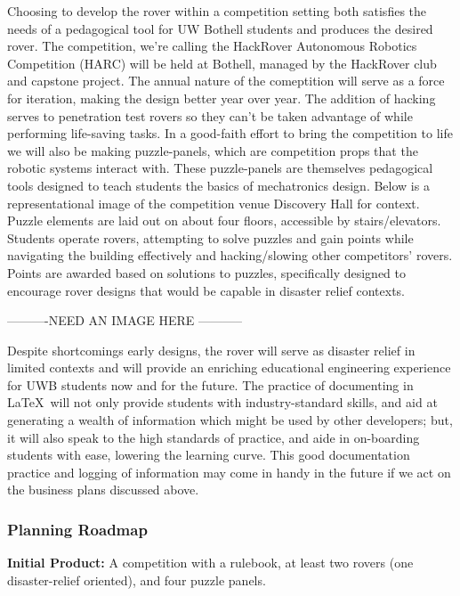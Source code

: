 \documentclass[a4paper, 10pt]{article}
\begin{document}
		Choosing to develop the rover within a competition setting both satisfies the needs of a pedagogical tool for UW Bothell students and produces the desired rover. The competition, we're calling the HackRover Autonomous Robotics Competition (HARC) will be held at Bothell, managed by the HackRover club and capstone project. The annual nature of the comeptition will serve as a force for iteration, making the design better year over year. The addition of hacking serves to penetration test rovers so they can't be taken advantage of while performing life-saving tasks. In a good-faith effort to bring the competition to life we will also be making puzzle-panels, which are competition props that the robotic systems interact with. These puzzle-panels are themselves pedagogical tools designed to teach students the basics of mechatronics design. Below is a representational image of the competition venue Discovery Hall for context. Puzzle elements are laid out on about four floors, accessible by stairs/elevators. Students operate rovers, attempting to solve puzzles and gain points while navigating the building effectively and hacking/slowing other competitors' rovers. Points are awarded based on solutions to puzzles, specifically designed to encourage rover designs that would be capable in disaster relief contexts.
		
		----------NEED  AN IMAGE HERE -----------
	
		Despite shortcomings early designs, the rover will serve as disaster relief in limited contexts and will provide an enriching educational engineering experience for UWB students now and for the future. The practice of documenting in \LaTeX\ will not only provide students with industry-standard skills, and aid at generating a wealth of information which might be used by other developers; but, it will also speak to the high standards of practice, and aide in on-boarding students with ease, lowering the learning curve. This good documentation practice and logging of information may come in handy in the future if we act on the business plans discussed above.
	
		\subsubsection{Planning Roadmap}
		\textbf{Initial Product:} A competition with a rulebook, at least two rovers (one disaster-relief oriented), and four puzzle panels.
		
\end{document}
